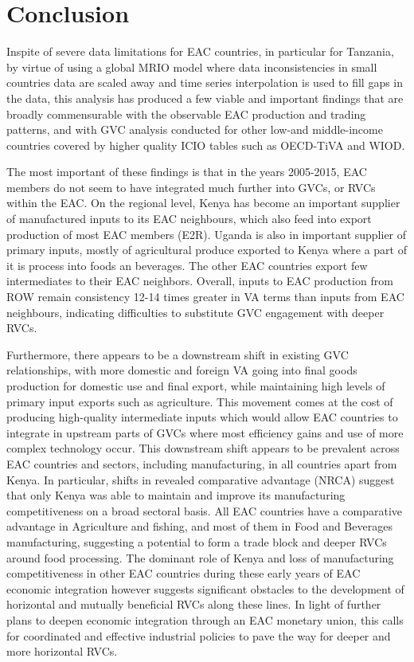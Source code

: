 \documentclass[a4paper]{article}
\begin{document}
\section{Conclusion} 

Inspite of severe data limitations for EAC countries, in particular for Tanzania, by virtue of using a global MRIO model where data inconsistencies in small countries data are scaled away and time series interpolation is used to fill gaps in the data, this analysis has produced a few viable and important findings that are broadly commensurable with the observable EAC production and trading patterns, and  with GVC analysis conducted for other low-and middle-income countries covered by higher quality ICIO tables such as OECD-TiVA and WIOD. \newline

The most important of these findings is that in the years 2005-2015, EAC members do not seem to have integrated much further into GVCs, or RVCs within the EAC. On the regional level, Kenya has become an important supplier of manufactured inputs to its EAC neighbours, which also feed into export production of most EAC members (E2R). Uganda is also in important supplier of primary inputs, mostly of agricultural produce exported to Kenya where a part of it is process into foods an beverages. The other EAC countries export few intermediates to their EAC neighbors. Overall, inputs to EAC production from ROW remain consistency 12-14 times greater in VA terms than inputs from EAC neighbours, indicating difficulties to substitute GVC engagement with deeper RVCs.  \newline

Furthermore, there appears to be a downstream shift in existing GVC relationships, with more domestic and foreign VA going into final goods production for domestic use and final export, while maintaining high levels of primary input exports such as agriculture. This movement comes at the cost of producing high-quality intermediate inputs which would allow EAC countries to integrate in upstream parts of GVCs where most efficiency gains and use of more complex technology occur. This downstream shift appears to be prevalent across EAC countries and sectors, including manufacturing, in all countries apart from Kenya. In particular, shifts in revealed comparative advantage (NRCA) suggest that only Kenya was able to maintain and improve its manufacturing competitiveness on a broad sectoral basis. All EAC countries have a comparative advantage in Agriculture and fishing, and most of them in Food and Beverages manufacturing, suggesting a potential to form a trade block and deeper RVCs around food processing. The dominant role of Kenya and loss of manufacturing competitiveness in other EAC countries during these early years of EAC economic integration however suggests significant obstacles to the development of horizontal and mutually beneficial RVCs along these lines. In light of further plans to deepen economic integration through an EAC monetary union, this calls for coordinated and effective industrial policies to pave the way for deeper and more horizontal RVCs. \newline 
\end{document}
